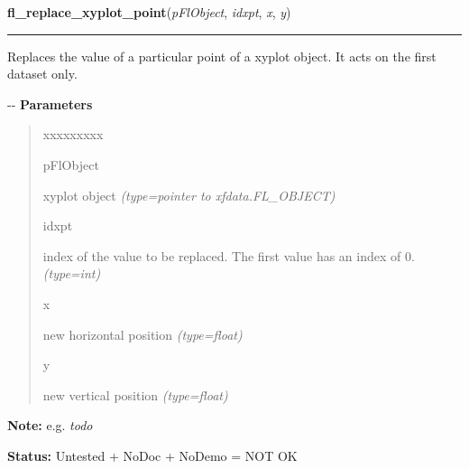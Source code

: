 \hspace{.8\funcindent}\begin{boxedminipage}{\funcwidth}

    \raggedright \textbf{fl\_replace\_xyplot\_point}(\textit{pFlObject}, \textit{idxpt}, \textit{x}, \textit{y})

    \vspace{-1.5ex}

    \rule{\textwidth}{0.5\fboxrule}
\setlength{\parskip}{2ex}

Replaces the value of a particular point of a xyplot object. It acts
on the first dataset only.

-{}-
\setlength{\parskip}{1ex}
      \textbf{Parameters}
      \vspace{-1ex}

      \begin{quote}
        \begin{Ventry}{xxxxxxxxx}

          \item[pFlObject]


xyplot object
            {\it (type=pointer to xfdata.FL\_OBJECT)}

          \item[idxpt]


index of the value to be replaced. The first value has an index of 0.
            {\it (type=int)}

          \item[x]


new horizontal position
            {\it (type=float)}

          \item[y]


new vertical position
            {\it (type=float)}

        \end{Ventry}

      \end{quote}

\textbf{Note:} 
e.g. \emph{todo}


\textbf{Status:} 
Untested + NoDoc + NoDemo = NOT OK


    \end{boxedminipage}

    \label{xformslib:flxyplot:fl_replace_xyplot_point_in_overlay}

